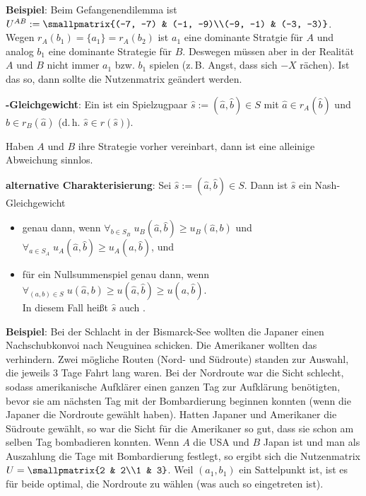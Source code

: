 \textbf{Beispiel}:
Beim Gefangenendilemma ist $U^{AB} := \smallpmatrix{(-7, -7) & (-1, -9)\\(-9, -1) & (-3, -3)}$.\\
Wegen $r_A(b_1) = \{a_1\} = r_A(b_2)$ ist $a_1$ eine dominante Stratgie für $A$
und analog $b_1$ eine dominante Strategie für $B$.
Deswegen müssen aber in der Realität $A$ und $B$ nicht immer $a_1$ bzw. $b_1$ spielen
(z.\,B. Angst, dass sich $-X$ rächen).
Ist das so, dann sollte die Nutzenmatrix geändert werden.

\linie
\pagebreak

\textbf{-Gleichgewicht}:
Ein  ist ein Spielzugpaar
$\widehat{s} := (\widehat{a}, \widehat{b}) \in S$ mit
$\widehat{a} \in r_A(\widehat{b})$ und $\widehat{b} \in r_B(\widehat{a})$
(d.\,h. $\widehat{s} \in r(\widehat{s})$).

Haben $A$ und $B$ ihre Strategie vorher vereinbart, dann ist eine alleinige Abweichung sinnlos.

\textbf{alternative Charakterisierung}:
Sei $\widehat{s} := (\widehat{a}, \widehat{b}) \in S$.
Dann ist $\widehat{s}$ ein Nash-Gleichgewicht
\begin{itemize}
    \item
    genau dann, wenn
    $\forall_{b \in S_B}\; u_B(\widehat{a}, \widehat{b}) \ge u_B(\widehat{a}, b)$ und
    $\forall_{a \in S_A}\; u_A(\widehat{a}, \widehat{b}) \ge u_A(a, \widehat{b})$, und

    \item
    für ein Nullsummenspiel genau dann, wenn
    $\forall_{(a, b) \in S}\;
    u(\widehat{a}, b) \ge u(\widehat{a}, \widehat{b}) \ge u(a, \widehat{b})$.\\
    In diesem Fall heißt $\widehat{s}$ auch .
\end{itemize}

\linie

\textbf{Beispiel}:
Bei der Schlacht in der Bismarck-See wollten die Japaner einen Nachschubkonvoi nach Neuguinea
schicken.
Die Amerikaner wollten das verhindern.
Zwei mögliche Routen (Nord- und Südroute) standen zur Auswahl,
die jeweils $3$ Tage Fahrt lang waren.
Bei der Nordroute war die Sicht schlecht, sodass amerikanische Aufklärer einen ganzen Tag zur
Aufklärung benötigten, bevor sie am nächsten Tag mit der Bombardierung beginnen konnten
(wenn die Japaner die Nordroute gewählt haben).
Hatten Japaner und Amerikaner die Südroute gewählt, so war die Sicht für die Amerikaner so gut,
dass sie schon am selben Tag bombadieren konnten.
Wenn $A$ die USA und $B$ Japan ist und man als Auszahlung die Tage mit Bombardierung festlegt,
so ergibt sich die Nutzenmatrix $U = \smallpmatrix{2 & 2\\1 & 3}$.
Weil $(a_1, b_1)$ ein Sattelpunkt ist, ist es für beide optimal, die Nordroute zu wählen
(was auch so eingetreten ist).

